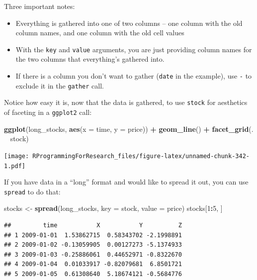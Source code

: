 \documentclass[]{book}
\makeatletter
\newenvironment{Shaded}{\begin{snugshade}}{\end{snugshade}}
\newcommand{\KeywordTok}[1]{\textcolor[rgb]{0.13,0.29,0.53}{\textbf{#1}}}
\newcommand{\DataTypeTok}[1]{\textcolor[rgb]{0.13,0.29,0.53}{#1}}
\newcommand{\DecValTok}[1]{\textcolor[rgb]{0.00,0.00,0.81}{#1}}
\newcommand{\StringTok}[1]{\textcolor[rgb]{0.31,0.60,0.02}{#1}}
\newcommand{\OperatorTok}[1]{\textcolor[rgb]{0.81,0.36,0.00}{\textbf{#1}}}
\newcommand{\NormalTok}[1]{#1}
\providecommand{\tightlist}{%
  \setlength{\itemsep}{0pt}\setlength{\parskip}{0pt}}
\newenvironment{kframe}{%
\medskip{}
\setlength{\fboxsep}{.8em}
 \def\at@end@of@kframe{}%
 \ifinner\ifhmode%
  \def\at@end@of@kframe{\end{minipage}}%
  \begin{minipage}{\columnwidth}%
 \fi\fi%
 \def\FrameCommand##1{\hskip\@totalleftmargin \hskip-\fboxsep
 \colorbox{shadecolor}{##1}\hskip-\fboxsep
     \hskip-\linewidth \hskip-\@totalleftmargin \hskip\columnwidth}%
 \MakeFramed {\advance\hsize-\width
   \@totalleftmargin\z@ \linewidth\hsize
   \@setminipage}}%
 {\par\unskip\endMakeFramed%
 \at@end@of@kframe}
\renewenvironment{Shaded}{\begin{kframe}}{\end{kframe}}
\theoremstyle{definition}
\theoremstyle{definition}
\theoremstyle{definition}
\theoremstyle{remark}
\makeatother
\begin{document}
Three important notes:

\begin{itemize}
\tightlist
\item
  Everything is gathered into one of two columns -- one column with the
  old column names, and one column with the old cell values
\item
  With the \texttt{key} and \texttt{value} arguments, you are just
  providing column names for the two columns that everything's gathered
  into.
\item
  If there is a column you don't want to gather (\texttt{date} in the
  example), use \texttt{-} to exclude it in the \texttt{gather} call.
\end{itemize}

Notice how easy it is, now that the data is gathered, to use
\texttt{stock} for aesthetics of faceting in a \texttt{ggplot2} call:

\begin{Shaded}
\begin{Highlighting}[]
\KeywordTok{ggplot}\NormalTok{(long_stocks, }\KeywordTok{aes}\NormalTok{(}\DataTypeTok{x =}\NormalTok{ time, }\DataTypeTok{y =}\NormalTok{ price)) }\OperatorTok{+}\StringTok{ }
\StringTok{  }\KeywordTok{geom_line}\NormalTok{() }\OperatorTok{+}\StringTok{ }
\StringTok{  }\KeywordTok{facet_grid}\NormalTok{(. }\OperatorTok{~}\StringTok{ }\NormalTok{stock)}
\end{Highlighting}
\end{Shaded}

\texttt{[image: RProgrammingForResearch\_files/figure-latex/unnamed-chunk-342-1.pdf]}

If you have data in a ``long'' format and would like to spread it out,
you can use \texttt{spread} to do that:

\begin{Shaded}
\begin{Highlighting}[]
\NormalTok{stocks <-}\StringTok{ }\KeywordTok{spread}\NormalTok{(long_stocks, }\DataTypeTok{key =}\NormalTok{ stock, }\DataTypeTok{value =}\NormalTok{ price)}
\NormalTok{stocks[}\DecValTok{1}\OperatorTok{:}\DecValTok{5}\NormalTok{, ]}
\end{Highlighting}
\end{Shaded}

\begin{verbatim}
##         time           X           Y          Z
## 1 2009-01-01  1.53862715  0.58343702 -2.1998891
## 2 2009-01-02 -0.13059905  0.00127273 -5.1374933
## 3 2009-01-03 -0.25886061  0.44652971 -0.8322670
## 4 2009-01-04  0.01033917 -0.82079681  6.8501721
## 5 2009-01-05  0.61308640  5.18674121 -0.5684776
\end{verbatim}
\end{document}
